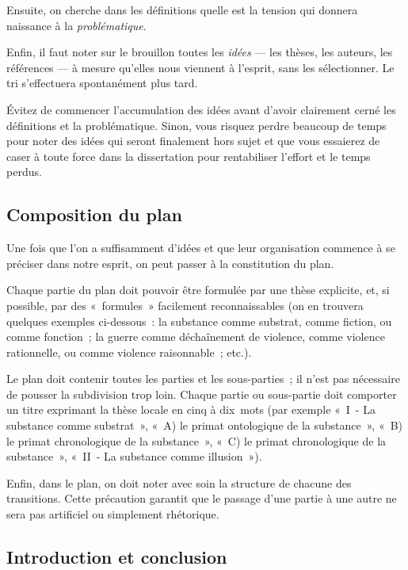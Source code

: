 \documentclass[a4paper,12pt]{article}
\begin{document}
Ensuite, on cherche dans les définitions quelle est la tension qui
donnera naissance à la \emph{problématique}.

Enfin, il faut noter sur le brouillon toutes les \emph{idées} --- les thèses,
les auteurs, les références --- à mesure qu'elles nous viennent à
l'esprit, sans les sélectionner. Le tri s'effectuera spontanément plus
tard.

Évitez de commencer l'accumulation des idées avant d'avoir clairement
cerné les définitions et la problématique. Sinon, vous risquez perdre
beaucoup de temps pour noter des idées qui seront finalement hors sujet
et que vous essaierez de caser à toute force dans la dissertation pour
rentabiliser l'effort et le temps perdus.

\subsection{Composition du plan}
\label{sec-1-3}

Une fois que l'on a suffisamment d'idées et que leur organisation
commence à se préciser dans notre esprit, on peut passer à la
constitution du plan.

Chaque partie du plan doit pouvoir être formulée par une thèse
explicite, et, si possible, par des « formules » facilement
reconnaissables (on en trouvera quelques exemples ci-dessous : la
substance comme substrat, comme fiction, ou comme fonction ; la guerre
comme déchaînement de violence, comme violence rationnelle, ou comme
violence raisonnable ; etc.).

Le plan doit contenir toutes les parties et les sous-parties ; il n'est
pas nécessaire de pousser la subdivision trop loin. Chaque partie ou
sous-partie doit comporter un titre exprimant la thèse locale en cinq à
dix mots (par exemple « I - La substance comme substrat », « A) le primat
ontologique de la substance », « B) le primat chronologique de la
substance », « C) le primat chronologique de la substance », « II - La
substance comme illusion »).

Enfin, dans le plan, on doit noter avec soin la structure de chacune des
transitions. Cette précaution garantit que le passage d'une partie à une
autre ne sera pas artificiel ou simplement rhétorique.

\subsection{Introduction et conclusion}
\label{sec-1-4}
\end{document}
